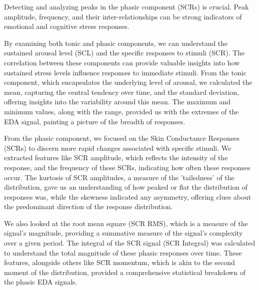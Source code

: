 Detecting and analyzing peaks in the phasic component (SCRs) is crucial. Peak amplitude, frequency, and their inter-relationships can be strong indicators of emotional and cognitive stress responses.

By examining both tonic and phasic components, we can understand the sustained arousal level (SCL) and the specific responses to stimuli (SCR). The correlation between these components can provide valuable insights into how sustained stress levels influence responses to immediate stimuli.
From the tonic component, which encapsulates the underlying level of arousal, we calculated the mean, capturing the central tendency over time, and the standard deviation, offering insights into the variability around this mean. The maximum and minimum values, along with the range, provided us with the extremes of the EDA signal, painting a picture of the breadth of responses.

From the phasic component, we focused on the Skin Conductance Responses (SCRs) to discern more rapid changes associated with specific stimuli. We extracted features like SCR amplitude, which reflects the intensity of the response, and the frequency of these SCRs, indicating how often these responses occur. The kurtosis of SCR amplitudes, a measure of the 'tailedness' of the distribution, gave us an understanding of how peaked or flat the distribution of responses was, while the skewness indicated any asymmetry, offering clues about the predominant direction of the response distribution.

We also looked at the root mean square (SCR RMS), which is a measure of the signal's magnitude, providing a summative measure of the signal's complexity over a given period. The integral of the SCR signal (SCR Integral) was calculated to understand the total magnitude of these phasic responses over time. These features, alongside others like SCR momentum, which is akin to the second moment of the distribution, provided a comprehensive statistical breakdown of the phasic EDA signals.


